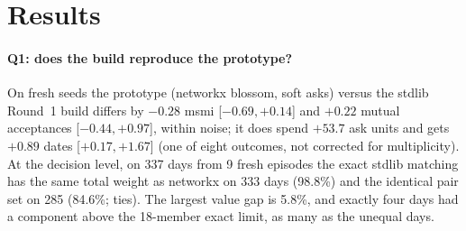 \documentclass[10pt,a4paper]{article}
\begin{document}
\section{Results}
\begin{table}[h]\centering\small
{}
\caption{Pooled stages A+C (90 paired episodes), difference from the supplied greedy baseline. Ask cost: $-3$ units for targeted asks, $0$ for baseline asks, $+51.5$ for soft asks. Greedy's mean is about 0.7 msmi per episode.}\end{table}

\paragraph{Q1: does the build reproduce the prototype?} On fresh seeds the prototype (networkx blossom, soft asks) versus the stdlib Round~1 build differs by $-0.28$ msmi [$-0.69,+0.14$] and $+0.22$ mutual acceptances [$-0.44,+0.97$], within noise; it does spend $+53.7$ ask units and gets $+0.89$ dates [$+0.17,+1.67$] (one of eight outcomes, not corrected for multiplicity). At the decision level, on 337 days from 9 fresh episodes the exact stdlib matching has the same total weight as networkx on 333 days (98.8\%) and the identical pair set on 285 (84.6\%; ties). The largest value gap is 5.8\%, and exactly four days had a component above the 18-member exact limit, as many as the unequal days.
\end{document}
